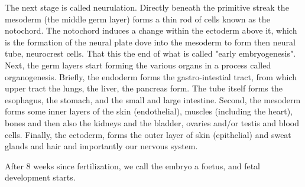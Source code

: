 The next stage is called neurulation.
Directly beneath the primitive streak the mesoderm (the middle germ layer) forms a thin rod of cells known as the notochord.
The notochord induces a change within the ectoderm above it, which is the formation of the neural plate dove into the mesoderm to form then neural tube, neurocrest cells.
That this the end of what is called "early embryogenesis".\\


Next, the germ layers start forming the various organs in a process called organogenesis.
Briefly, the endoderm forms the gastro-intestial tract, from which upper tract the lungs, the liver, the pancreas form. 
The tube itself forms the esophagus, the stomach, and the small and large intestine.
Second, the mesoderm forms some inner layers of the skin (endothelial), muscles (including the heart), bones and then also the kidneys and the bladder, ovaries and/or testis and blood cells.
Finally, the ectoderm, forms the outer layer of skin (epithelial) and sweat glands and hair and importantly our nervous system.

After 8 weeks since fertilization, we call the embryo a foetus, and fetal development starts.










